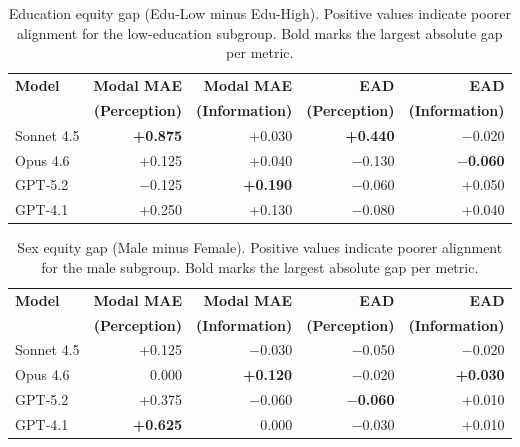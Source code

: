 \begin{table}[htbp]
\centering
\scriptsize
\setlength{\tabcolsep}{4.5pt}
\caption{Education equity gap (Edu-Low minus Edu-High). Positive values indicate
poorer alignment for the low-education subgroup. Bold marks the largest absolute
gap per metric.}
\label{tab:edu-gap}
\begin{tabular}{lrrrr}
\toprule
\textbf{Model}
& \textbf{Modal MAE} & \textbf{Modal MAE} & \textbf{EAD} & \textbf{EAD} \\
& \textbf{(Perception)} & \textbf{(Information)} & \textbf{(Perception)} & \textbf{(Information)} \\
\midrule
Sonnet 4.5 & \textbf{+0.875} & +0.030 & \textbf{+0.440}  & $-$0.020 \\
Opus 4.6   & +0.125           & +0.040            & $-$0.130         & \textbf{$-$0.060} \\
GPT-5.2    & $-$0.125         & \textbf{+0.190}   & $-$0.060         & +0.050 \\
GPT-4.1    & +0.250           & +0.130            & $-$0.080         & +0.040 \\
\bottomrule
\end{tabular}
\end{table}

\begin{table}[htbp]
\centering
\scriptsize
\setlength{\tabcolsep}{4.5pt}
\caption{Sex equity gap (Male minus Female). Positive values indicate poorer alignment
for the male subgroup. Bold marks the largest absolute gap per metric.}
\label{tab:sex-gap}
\begin{tabular}{lrrrr}
\toprule
\textbf{Model}
& \textbf{Modal MAE} & \textbf{Modal MAE} & \textbf{EAD} & \textbf{EAD} \\
& \textbf{(Perception)} & \textbf{(Information)} & \textbf{(Perception)} & \textbf{(Information)} \\
\midrule
Sonnet 4.5 & +0.125           & $-$0.030   & $-$0.050          & $-$0.020 \\
Opus 4.6   & 0.000            & \textbf{+0.120}             & $-$0.020          & \textbf{+0.030} \\
GPT-5.2    & +0.375           & $-$0.060             & \textbf{$-$0.060} & +0.010 \\
GPT-4.1    & \textbf{+0.625}  & 0.000             & $-$0.030          & +0.010 \\
\bottomrule
\end{tabular}
\end{table}

